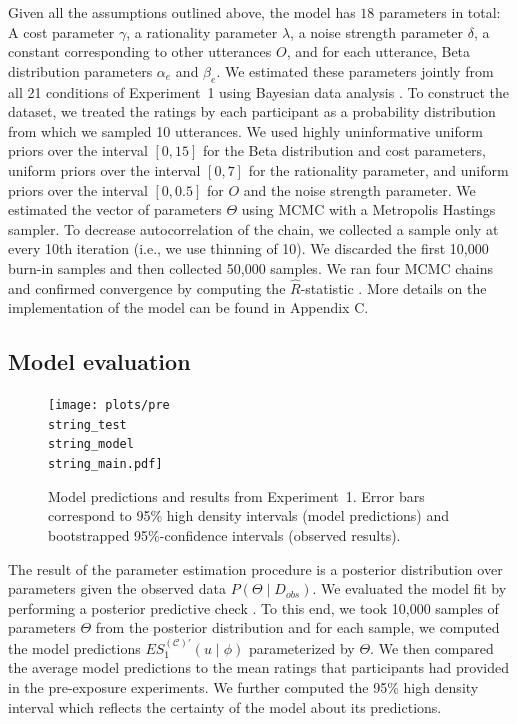 \documentclass[man, floatsintext]{apa6}
\begin{document}
Given all the assumptions outlined above, the model has  $18$ parameters in total: A cost parameter $\gamma$, a rationality parameter $\lambda$, a noise strength parameter $\delta$, a constant corresponding to other utterances $O$, and for each utterance, Beta distribution parameters $\alpha_e$ and $\beta_e$. We estimated these parameters jointly from all 21 conditions of Experiment~1 using Bayesian data analysis \parencite[BDA; see, e.g.,][]{Kruschke2015}. To construct the dataset, we treated the ratings by each participant as a probability distribution from which we sampled 10 utterances. We used highly uninformative
uniform priors over the interval $[0,15]$ for the Beta distribution and cost parameters, uniform priors over the interval $[0,7]$ for the rationality parameter, and uniform priors over the interval $[0,0.5]$ for $O$ and the noise strength parameter. We estimated the vector of parameters $\Theta$ using MCMC with a Metropolis Hastings sampler. To decrease autocorrelation of the chain, we collected a sample only at every 10th iteration (i.e., we use thinning of 10). We discarded the first 10,000 burn-in samples and then collected 50,000 samples.  We ran four MCMC chains and confirmed convergence by computing the $\hat{R}$-statistic \parencite{Gelman2003}. More details on the implementation of the model can be found in Appendix C.

\subsection{Model evaluation}



\begin{figure}[th!]
\texttt{[image: plots/pre\\string\_test\\string\_model\\string\_main.pdf]}
\caption{Model predictions and results from Experiment~1. Error bars correspond to 95\% high density intervals (model predictions) and bootstrapped 95\%-confidence intervals (observed results). \label{fig:norming-results-model-main}}

\end{figure}


The result of the parameter estimation procedure is a posterior distribution over parameters given the observed data $P(\Theta \mid D_{obs})$. We evaluated
the model fit by performing a posterior predictive check \parencite[PPC;][]{Kruschke2015}. To this end, we took 10,000 samples of parameters $\Theta$ from the posterior distribution
and for each sample, we computed the model predictions $ES_1^{(\mathscr{C})'}(u \mid \phi)$ parameterized by $\Theta$. We then compared the average model predictions to the
mean ratings that participants had provided in the pre-exposure experiments. We further computed the 95\% high density interval  \parencite[HDI;][]{Kruschke2015} which reflects the certainty of the model
about its predictions.
\end{document}
